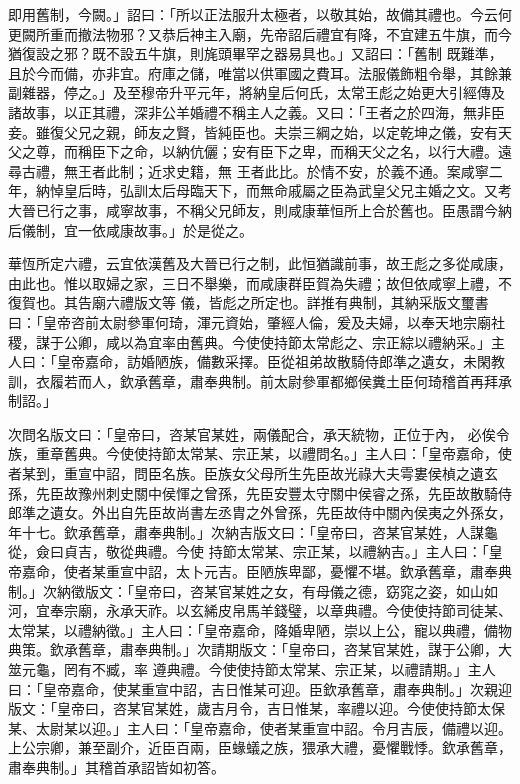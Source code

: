 \begin{pinyinscope}
 即用舊制，今闕。」詔曰：「所以正法服升太極者，以敬其始，故備其禮也。今云何更闕所重而撤法物邪？又恭后神主入廟，先帝詔后禮宜有降，不宜建五牛旗，而今猶復設之邪？既不設五牛旗，則旄頭畢罕之器易具也。」又詔曰：「舊制
 既難準，且於今而備，亦非宜。府庫之儲，唯當以供軍國之費耳。法服儀飾粗令舉，其餘兼副雜器，停之。」及至穆帝升平元年，將納皇后何氏，太常王彪之始更大引經傳及諸故事，以正其禮，深非公羊婚禮不稱主人之義。又曰：「王者之於四海，無非臣妾。雖復父兄之親，師友之賢，皆純臣也。夫崇三綱之始，以定乾坤之儀，安有天父之尊，而稱臣下之命，以納伉儷；安有臣下之卑，而稱天父之名，以行大禮。遠尋古禮，無王者此制；近求史籍，無
 王者此比。於情不安，於義不通。案咸寧二年，納悼皇后時，弘訓太后母臨天下，而無命戚屬之臣為武皇父兄主婚之文。又考大晉已行之事，咸寧故事，不稱父兄師友，則咸康華恒所上合於舊也。臣愚謂今納后儀制，宜一依咸康故事。」於是從之。



 華恆所定六禮，云宜依漢舊及大晉已行之制，此恒猶識前事，故王彪之多從咸康，由此也。惟以取婦之家，三日不舉樂，而咸康群臣賀為失禮；故但依咸寧上禮，不復賀也。其告廟六禮版文等
 儀，皆彪之所定也。詳推有典制，其納采版文璽書曰：「皇帝咨前太尉參軍何琦，渾元資始，肇經人倫，爰及夫婦，以奉天地宗廟社稷，謀于公卿，咸以為宜率由舊典。今使使持節太常彪之、宗正綜以禮納采。」主人曰：「皇帝嘉命，訪婚陋族，備數采擇。臣從祖弟故散騎侍郎準之遺女，未閑教訓，衣履若而人，欽承舊章，肅奉典制。前太尉參軍都鄉侯糞土臣何琦稽首再拜承制詔。」



 次問名版文曰：「皇帝曰，咨某官某姓，兩儀配合，承天統物，正位于內，
 必俟令族，重章舊典。今使使持節太常某、宗正某，以禮問名。」主人曰：「皇帝嘉命，使者某到，重宣中詔，問臣名族。臣族女父母所生先臣故光祿大夫雩婁侯楨之遺玄孫，先臣故豫州刺史關中侯惲之曾孫，先臣安豐太守關中侯睿之孫，先臣故散騎侍郎準之遺女。外出自先臣故尚書左丞胄之外曾孫，先臣故侍中關內侯夷之外孫女，年十七。欽承舊章，肅奉典制。」次納吉版文曰：「皇帝曰，咨某官某姓，人謀龜從，僉曰貞吉，敬從典禮。今使
 持節太常某、宗正某，以禮納吉。」主人曰：「皇帝嘉命，使者某重宣中詔，太卜元吉。臣陋族卑鄙，憂懼不堪。欽承舊章，肅奉典制。」次納徵版文：「皇帝曰，咨某官某姓之女，有母儀之德，窈窕之姿，如山如河，宜奉宗廟，永承天祚。以玄絺皮帛馬羊錢璧，以章典禮。今使使持節司徒某、太常某，以禮納徵。」主人曰：「皇帝嘉命，降婚卑陋，崇以上公，寵以典禮，備物典策。欽承舊章，肅奉典制。」次請期版文：「皇帝曰，咨某官某姓，謀于公卿，大筮元龜，罔有不臧，率
 遵典禮。今使使持節太常某、宗正某，以禮請期。」主人曰：「皇帝嘉命，使某重宣中詔，吉日惟某可迎。臣欽承舊章，肅奉典制。」次親迎版文：「皇帝曰，咨某官某姓，歲吉月令，吉日惟某，率禮以迎。今使使持節太保某、太尉某以迎。」主人曰：「皇帝嘉命，使者某重宣中詔。令月吉辰，備禮以迎。上公宗卿，兼至副介，近臣百兩，臣蝝蟻之族，猥承大禮，憂懼戰悸。欽承舊章，肅奉典制。」其稽首承詔皆如初答。




\end{pinyinscope}
